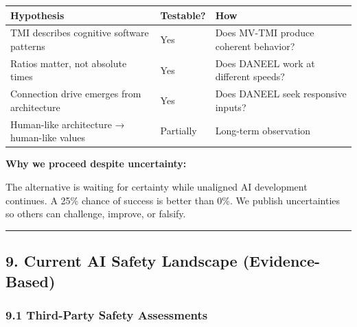 \documentclass[
  11pt,
]{article}
\newcounter{none} %
\begin{document}
{\def\LTcaptype{none} %
\begin{longtable}[]{@{}
  >{\raggedright\arraybackslash}p{}
  >{\raggedright\arraybackslash}p{}
  >{\raggedright\arraybackslash}p{}@{}}
\toprule\noalign{}
\begin{minipage}[b]{\linewidth}\raggedright
Hypothesis
\end{minipage} & \begin{minipage}[b]{\linewidth}\raggedright
Testable?
\end{minipage} & \begin{minipage}[b]{\linewidth}\raggedright
How
\end{minipage} \\
\midrule\noalign{}
\endhead
\bottomrule\noalign{}
\endlastfoot
TMI describes cognitive software patterns & Yes & Does MV-TMI produce
coherent behavior? \\
Ratios matter, not absolute times & Yes & Does DANEEL work at different
speeds? \\
Connection drive emerges from architecture & Yes & Does DANEEL seek
responsive inputs? \\
Human-like architecture → human-like values & Partially & Long-term
observation \\
\end{longtable}
}

\textbf{Why we proceed despite uncertainty:}

The alternative is waiting for certainty while unaligned AI development
continues. A 25\% chance of success is better than 0\%. We publish
uncertainties so others can challenge, improve, or falsify.

\begin{center}\rule{0.5\linewidth}{0.5pt}\end{center}

\subsection{9. Current AI Safety Landscape
(Evidence-Based)}\label{current-ai-safety-landscape-evidence-based}

\subsubsection{9.1 Third-Party Safety
Assessments}\label{third-party-safety-assessments}
\end{document}

